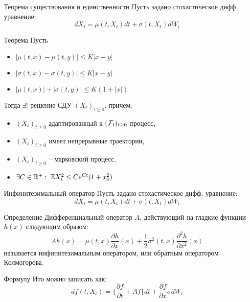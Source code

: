\documentclass{beamer}
\begin{document}
\begin{frame}{Теорема существования и единственности}
    Пусть задано стохастическое дифф. уравнение:
    $$
        dX_t = \mu(t, X_t) dt + \sigma(t, X_t) dW_t
    $$
    \begin{block}{Теорема}
        Пусть 
        \begin{itemize}
            \item $|\mu(t, x) - \mu(t, y)| \leq K |x - y|$
            \item $|\sigma(t, x) - \sigma(t, y)| \leq K |x - y|$
            \item $|\mu(t, x)| + |\sigma(t, y)| \leq K (1 + |x|)$
        \end{itemize}

        Тогда $\exists !$ решение СДУ $(X_t)_{t\geq 0}$, причем:
        \begin{itemize}
            \item $(X_t)_{t\geq 0}$ адаптированный к $(\mathcal{F}_t)_{t\geq0}$ процесс,
            \item $(X_t)_{t\geq 0}$ имеет непрерывные траектории,
            \item $(X_t)_{t\geq 0}$ -- марковский процесс,
            \item $\exists C \in \mathbb{R}^+: \;\mathbb{E} X_t^2 \leq Ce^{Ct}(1+x_0^2)$
        \end{itemize}
    \end{block}
\end{frame}

\begin{frame}{Инфинитезимальный оператор}
    Пусть задано стохастическое дифф. уравнение:
    $$
        dX_t = \mu(t, X_t) dt + \sigma(t, X_t) dW_t
    $$
    \begin{block}{Определение}
    Дифференциальный оператор $A$, действующий на гладкие функции $h(x)$ следующим образом:
    $$
        Ah(x) = \mu(t, x) \dfrac{\partial h}{\partial x}(x) + \dfrac{1}{2}\sigma^2(t, x) \dfrac{\partial^2 h}{\partial x^2}(x)
    $$ называется инфинитезимальным оператором, или обратным оператором Колмогорова.        
    \end{block}

    Формулу Ито можно записать как:
    $$
        df(t, X_t)=\{\dfrac{\partial f}{\partial t}+Af\}dt +\dfrac{\partial f}{\partial x}\sigma dW_t
    $$

\end{frame}
\end{document}
